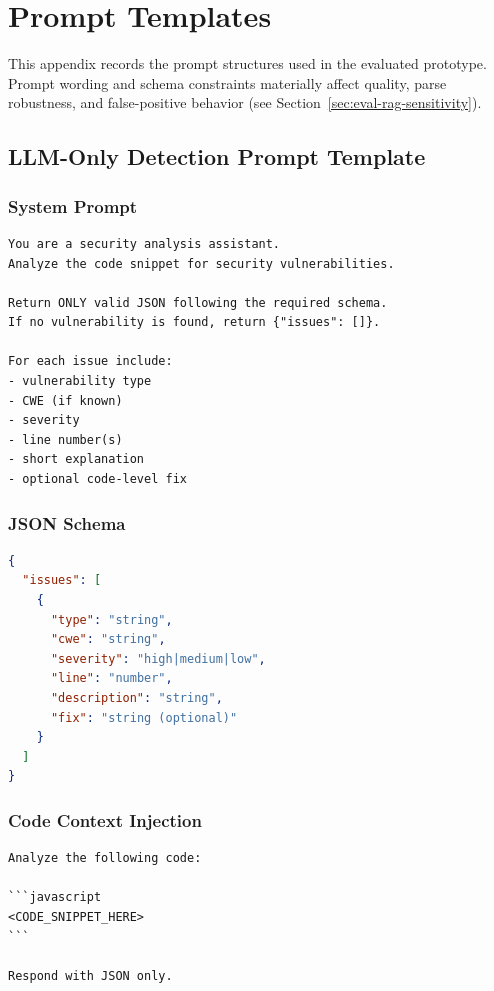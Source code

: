\chapter{Prompt Templates}
\label{app:prompt-templates}

This appendix records the prompt structures used in the evaluated prototype. Prompt wording and schema constraints materially affect quality, parse robustness, and false-positive behavior (see Section~\ref{sec:eval-rag-sensitivity}).

\section{LLM-Only Detection Prompt Template}
\label{sec:prompt-llm-only}

\subsection{System Prompt}
\begin{lstlisting}[basicstyle=\small\ttfamily, breaklines=true, frame=single, caption={LLM-only system prompt}, label={lst:system-prompt}]
You are a security analysis assistant.
Analyze the code snippet for security vulnerabilities.

Return ONLY valid JSON following the required schema.
If no vulnerability is found, return {"issues": []}.

For each issue include:
- vulnerability type
- CWE (if known)
- severity
- line number(s)
- short explanation
- optional code-level fix
\end{lstlisting}

\subsection{JSON Schema}
\begin{lstlisting}[language=json, basicstyle=\small\ttfamily, breaklines=true, frame=single, caption={Expected JSON output schema}, label={lst:json-schema}]
{
  "issues": [
    {
      "type": "string",
      "cwe": "string",
      "severity": "high|medium|low",
      "line": "number",
      "description": "string",
      "fix": "string (optional)"
    }
  ]
}
\end{lstlisting}

\subsection{Code Context Injection}
\begin{lstlisting}[basicstyle=\small\ttfamily, breaklines=true, frame=single, caption={Code context injection}, label={lst:code-context}]
Analyze the following code:

```javascript
<CODE_SNIPPET_HERE>
```

Respond with JSON only.
\end{lstlisting}

